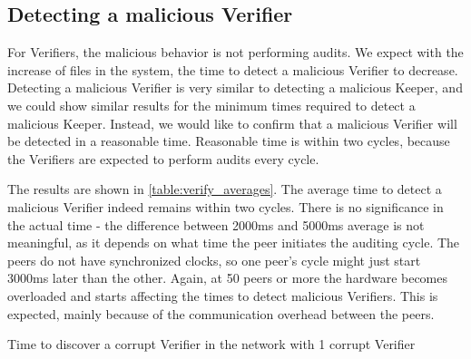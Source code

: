 \subsection{Detecting a malicious Verifier}

For Verifiers, the malicious behavior is not performing audits.
We expect with the increase of files in the system, the time to detect a malicious Verifier to decrease.
Detecting a malicious Verifier is very similar to detecting a malicious Keeper,
and we could show similar results for the minimum times required to detect a malicious Keeper.
Instead, we would like to confirm that a malicious Verifier will be detected in a reasonable time.
Reasonable time is within two cycles, because the Verifiers are expected to perform audits every cycle.

The results are shown in \autoref{table:verify_averages}.
The average time to detect a malicious Verifier indeed remains within two cycles.
There is no significance in the actual time - the difference between 2000ms and 5000ms average is not
meaningful, as it depends on what time the peer initiates the auditing cycle.
The peers do not have synchronized clocks, so one peer's cycle might just start 3000ms later than the other.
Again, at 50 peers or more the hardware becomes overloaded and starts affecting the times to detect 
malicious Verifiers.
This is expected, mainly because of the communication overhead between the peers.

\begin{table}
  \centering
  \caption{Time to discover a corrupt Verifier in the network with 1 corrupt Verifier}
  \label{table:verify_averages}
\end{table}

